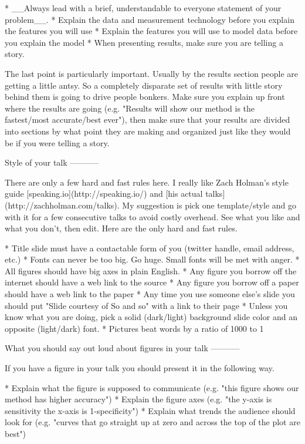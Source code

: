 \documentclass[12pt]{article}
\begin{document}
* __Always lead with a brief, understandable to everyone statement of your problem__. 
* Explain the data and measurement technology before you explain the features you will use
* Explain the features you will use to model data before you explain the model
* When presenting results, make sure you are telling a story. 

The last point is particularly important. Usually by the results section people are getting a little antsy. So a completely disparate set of results with little story behind them is going to drive people bonkers. Make sure you explain up front where the results are going (e.g. "Results will show our method is the fastest/most accurate/best ever"), then make sure that your results are divided into sections by what point they are making and organized just like they would be if you were telling a story. 


Style of your talk
-----------

There are only a few hard and fast rules here. I really like Zach Holman's style guide [speaking.io](http://speaking.io/) and [his actual talks](http://zachholman.com/talks). My suggestion is pick one template/style and go with it for a few consecutive talks to avoid costly overhead. See what you like and what you don't, then edit. Here are the only hard and fast rules. 

* Title slide must have a contactable form of you (twitter handle, email address, etc.)
* Fonts can never be too big. Go huge. Small fonts will be met with anger. 
* All figures should have big axes in plain English. 
* Any figure you borrow off the internet should have a web link to the source
* Any figure you borrow off a paper should have a web link to the paper
* Any time you use someone else's slide you should put "Slide courtesy of So and so" with a link to their page
* Unless you know what you are doing, pick a solid (dark/light) background slide color and an opposite (light/dark) font. 
* Pictures beat words by a ratio of 1000 to 1 



What you should say out loud about figures in your talk
-----------

If you have a figure in your talk you should present it in the following way. 
 
* Explain what the figure is supposed to communicate (e.g. "this figure shows our method has higher accuracy")
* Explain the figure axes (e.g. "the y-axis is sensitivity the x-axis is 1-specificity")
* Explain what trends the audience should look for (e.g. "curves that go straight up at zero and across the top of the plot are best")
 
\end{document}
